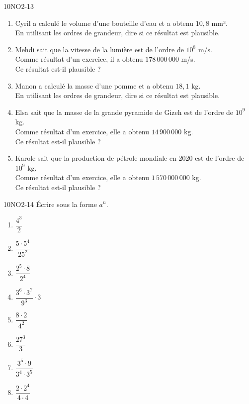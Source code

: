 \documentclass[a4paper,12pt]{report}
\begin{document}
\begin{EXO}{}{10NO2-13}


\begin{enumerate}[]
	\item Cyril a calculé le volume d'une bouteille d'eau et a obtenu $10{,}8$ mm³.\\
          En utilisant les ordres de grandeur, dire si ce résultat est plausible.
	\item Mehdi sait que la vitesse de la lumière est de l'ordre de $10^{8}$ m/s.\\
          Comme résultat d'un exercice, il a obtenu $178\,000\,000$ m/s.\\
          Ce résultat est-il plausible ?
	\item Manon a calculé la masse d'une pomme et a obtenu $18{,}1$ kg.\\
          En utilisant les ordres de grandeur, dire si ce résultat est plausible.
	\item Elsa sait que la masse de la grande pyramide de Gizeh est de l'ordre de $10^{9}$ kg.\\
          Comme résultat d'un exercice, elle a obtenu $14\,900\,000$ kg.\\
          Ce résultat est-il plausible ?
	\item Karole sait que la production de pétrole mondiale en 2020 est de l'ordre de $10^{9}$ kg.\\
          Comme résultat d'un exercice, elle a obtenu $1\,570\,000\,000$ kg.\\
          Ce résultat est-il plausible ?
\end{enumerate}
\end{EXO}

\begin{EXO}{}{10NO2-14}
Écrire sous la forme $a^n$.

\begin{enumerate}[itemsep=2em]
	\item $\dfrac{4^3}{2}$
	\item $\dfrac{5\cdot 5^4}{25^2}$
	\item $\dfrac{2^5\cdot 8}{2^4}$
	\item $\dfrac{3^6\cdot 3^7}{9^3}\cdot 3$
	\item $\dfrac{8\cdot 2}{4^2}$
	\item $\dfrac{27^3}{3}$
	\item $\dfrac{3^5\cdot 9}{3^4 \cdot 3^5}$
	\item $\dfrac{2\cdot 2^4}{4\cdot 4}$
\end{enumerate}
\end{EXO}
\end{document}
